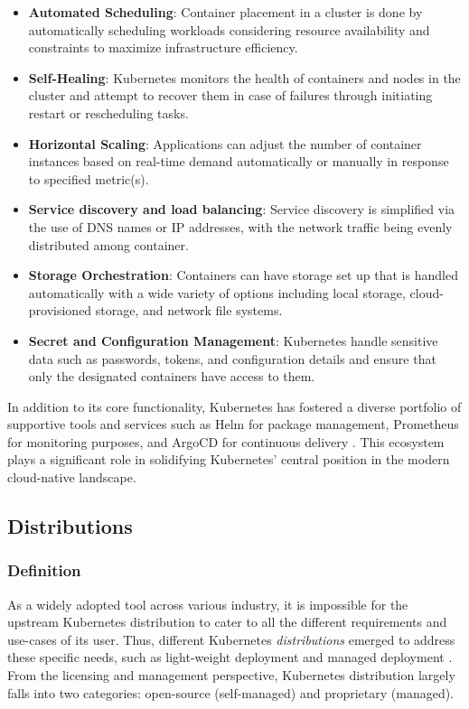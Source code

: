 \begin{itemize}

\item \textbf{Automated Scheduling}: Container placement in a cluster is done by automatically scheduling workloads considering resource availability and constraints to maximize infrastructure efficiency. 

\item \textbf{Self-Healing}: Kubernetes monitors the health of containers and nodes in the cluster and attempt to recover them in case of failures through initiating restart or rescheduling tasks.

\item \textbf{Horizontal Scaling}: Applications can adjust the number of container instances based on real-time demand automatically or manually in response to specified metric(s).

\item \textbf{Service discovery and load balancing}: Service discovery is simplified via the use of DNS names or IP addresses, with the network traffic being evenly distributed among container.

\item \textbf{Storage Orchestration}: Containers can have storage set up that is handled automatically with a wide variety of options including local storage, cloud-provisioned storage, and network file systems.

\item \textbf{Secret and Configuration Management}: Kubernetes handle sensitive data such as passwords, tokens, and configuration details and ensure that only the designated containers have access to them. 

\end{itemize}

In addition to its core functionality, Kubernetes has fostered a diverse portfolio of supportive tools and services such as Helm for package management, Prometheus for monitoring purposes, and ArgoCD for continuous delivery \cite{noauthor_helm_nodate, prometheus_overview_nodate, noauthor_argo_nodate}. This ecosystem plays a significant role in solidifying Kubernetes' central position in the modern cloud-native landscape.

\subsection{Distributions}
\subsubsection{Definition}
As a widely adopted tool across various industry, it is impossible for the upstream Kubernetes distribution to cater to all the different requirements and use-cases of its user. Thus, different Kubernetes \textit{distributions} emerged to address these specific needs, such as light-weight deployment and managed deployment \cite{bohm_profiling_2021, pereira_ferreira_performance_2019}. From the licensing and management perspective, Kubernetes distribution largely falls into two categories: open-source (self-managed) and proprietary (managed).

